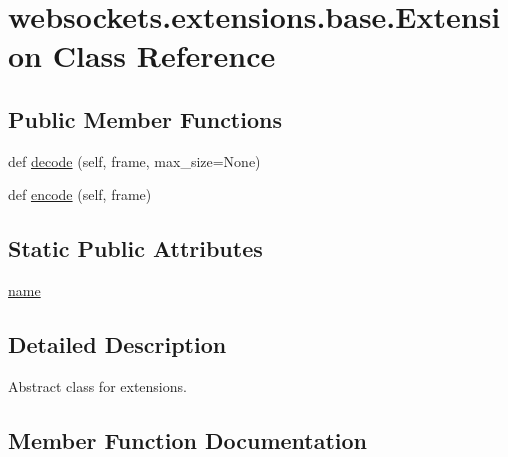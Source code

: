 \hypertarget{classwebsockets_1_1extensions_1_1base_1_1_extension}{}\section{websockets.\+extensions.\+base.\+Extension Class Reference}
\label{classwebsockets_1_1extensions_1_1base_1_1_extension}
\subsection*{Public Member Functions}
\begin{DoxyCompactItemize}
\item 
def \hyperlink{classwebsockets_1_1extensions_1_1base_1_1_extension_adcb4cfb9032c44043a1c30d0e54994b8}{decode} (self, frame, max\+\_\+size=None)
\item 
def \hyperlink{classwebsockets_1_1extensions_1_1base_1_1_extension_a879d37f7c84463e78a19476410611697}{encode} (self, frame)
\end{DoxyCompactItemize}
\subsection*{Static Public Attributes}
\begin{DoxyCompactItemize}
\item 
\hyperlink{classwebsockets_1_1extensions_1_1base_1_1_extension_a1d431040b82993ca4ce18d4d23437a17}{name}
\end{DoxyCompactItemize}


\subsection{Detailed Description}
\begin{DoxyVerb}Abstract class for extensions.\end{DoxyVerb}
 

\subsection{Member Function Documentation}
\mbox{\label{classwebsockets_1_1extensions_1_1base_1_1_extension_adcb4cfb9032c44043a1c30d0e54994b8}} 
